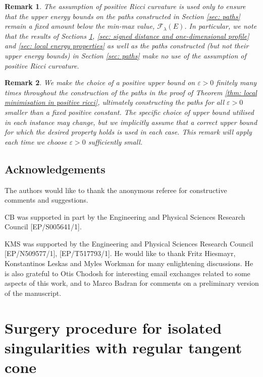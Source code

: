 \documentclass[11pt]{article}
\newtheorem{rem}{Remark}
\begin{document}
\begin{rem}
    The assumption of positive Ricci curvature is used only to ensure that the upper energy bounds on the paths constructed in Section \ref{sec: paths} remain a fixed amount below the min-max value, $\mathcal{F}_\lambda(E)$. In particular, we note that the results of Sections \ref{sec: cmc surgery}, \ref{sec: signed distance and one-dimensional profile} and \ref{sec: local energy properties} as well as the paths constructed (but not their upper energy bounds) in Section \ref{sec: paths} make no use of the assumption of positive Ricci curvature.
\end{rem}

\begin{rem}
    We make the choice of a positive upper bound on $\varepsilon > 0$ finitely many times throughout the construction of the paths in the proof of Theorem \ref{thm: local minimisation in positive ricci}, ultimately constructing the paths for all $\varepsilon > 0$ smaller than a fixed positive constant. The specific choice of upper bound utilised in each instance may change, but we implicitly assume that a correct upper bound for which the desired property holds is used in each case. This remark will apply each time we choose $\varepsilon > 0$ sufficiently small.
\end{rem}

\subsection*{Acknowledgements}
The authors would like to thank the anonymous referee for constructive comments and suggestions.

\bigskip

CB was supported in part by the Engineering and Physical Sciences Research Council
[EP/S005641/1].

\bigskip

KMS was supported by the Engineering and Physical Sciences Research Council [EP/N509577/1], [EP/T517793/1]. He would like to thank Fritz Hiesmayr, Konstantinos Leskas and Myles Workman for many enlightening discussions. He is also grateful to Otis Chodosh for interesting email exchanges related to some aspects of this work, and to Marco Badran for comments on a preliminary version of the manuscript.

\section{Surgery procedure for isolated singularities with regular tangent cone}\label{sec: cmc surgery}
\end{document}
